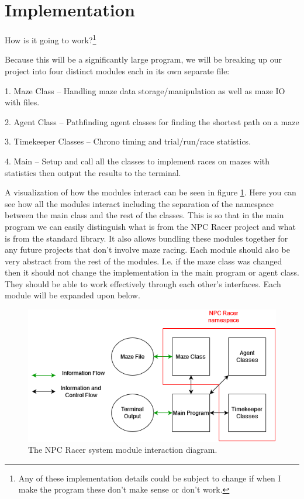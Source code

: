 \documentclass[letterpaper,12pt]{article}  %
\begin{document}
\section{Implementation}
How is it going to work?\footnote{Any of these implementation details could be 
	subject to change if when I make the program these don’t make sense or 
	don’t 
	work.}

Because this will be a significantly large program, we will be breaking up our 
project into four distinct modules each in its own separate file:

1.	Maze Class – Handling maze data storage/manipulation as well as maze IO 
with files.

2.	Agent Class – Pathfinding agent classes for finding the shortest path on a 
maze

3.	Timekeeper Classes – Chrono timing and trial/run/race statistics.

4.	Main – Setup and call all the classes to implement races on mazes with 
statistics then output the results to the terminal.

A visualization of how the modules interact can be seen in figure 
\ref{fig:modules}. Here you can see how all the modules interact including the 
separation of the namespace between the main class and the rest of the classes. 
This is so that in the main program we can easily distinguish what is from the 
NPC Racer project and what is from the standard library. It also allows 
bundling these modules together for any future projects that don’t involve maze 
racing. Each module should also be very abstract from the rest of the modules. 
I.e. if the maze class was changed then it should not change the implementation 
in the main program or agent class. They should be able to work effectively 
through each other’s interfaces. Each module will be expanded upon below. 

\begin{figure}[h]  %
	\centering  %
	\includegraphics[width = 9 cm ]{NPC_Racer_System_Modules.drawio.png}
	\caption{The NPC Racer system module interaction diagram.}
	\label{fig:modules}
\end{figure}
\end{document}
